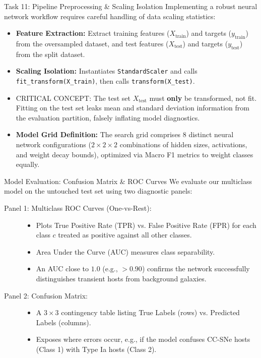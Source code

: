 \documentclass[9pt]{beamer}
\begin{document}
\begin{frame}{Task 11: Pipeline Preprocessing \& Scaling Isolation}
  Implementing a robust neural network workflow requires careful handling of data scaling statistics:
  \begin{itemize}
    \item \textbf{Feature Extraction:} Extract training features ($X_{\text{train}}$) and targets ($y_{\text{train}}$) from the oversampled dataset, and test features ($X_{\text{test}}$) and targets ($y_{\text{test}}$) from the split dataset.
    \item \textbf{Scaling Isolation:} Instantiates \texttt{StandardScaler} and calls \texttt{fit\_transform(X\_train)}, then calls \texttt{transform(X\_test)}. 
    \item \alert{CRITICAL CONCEPT:} The test set $X_{\text{test}}$ must \textbf{only} be transformed, not fit. Fitting on the test set leaks mean and standard deviation information from the evaluation partition, falsely inflating model diagnostics.
    \item \textbf{Model Grid Definition:} The search grid comprises $8$ distinct neural network configurations ($2 \times 2 \times 2$ combinations of hidden sizes, activations, and weight decay bounds), optimized via Macro F1 metrics to weight classes equally.
  \end{itemize}
\end{frame}

\begin{frame}{Model Evaluation: Confusion Matrix \& ROC Curves}
  We evaluate our multiclass model on the untouched test set using two diagnostic panels:
  \begin{description}
    \item[Panel 1: Multiclass ROC Curves (One-vs-Rest):]
      \begin{itemize}
        \item Plots True Positive Rate (TPR) vs. False Positive Rate (FPR) for each class $c$ treated as positive against all other classes.
        \item Area Under the Curve (AUC) measures class separability.
        \item An AUC close to $1.0$ (e.g., $>0.90$) confirms the network successfully distinguishes transient hosts from background galaxies.
      \end{itemize}
    \item[Panel 2: Confusion Matrix:]
      \begin{itemize}
        \item A $3 \times 3$ contingency table listing True Labels (rows) vs. Predicted Labels (columns).
        \item Exposes where errors occur, e.g., if the model confuses CC-SNe hosts (Class 1) with Type Ia hosts (Class 2).
      \end{itemize}
  \end{description}
\end{frame}
\end{document}
